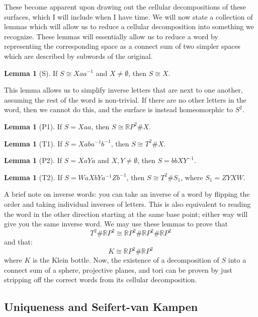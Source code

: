 \documentclass[11pt, oneside]{amsart}   	%
\theoremstyle{definition}
\newtheorem{lemma}[theorem]{Lemma}
\begin{document}
	These become apparent upon drawing out the cellular decompositions of these surfaces, which I will include when I have time. We will now state a collection 
	of lemmas which will allow us to reduce a cellular decomposition into something we recognize. These lemmas will essentially allow us to reduce a word by 
	representing the corresponding space as a connect sum of two simpler spaces which are described by subwords of the original.
	
	\begin{lemma}[S]
		If $S\cong Xaa^{-1}$ and $X\neq\emptyset$, then $S\cong X$.
	\end{lemma}
	
	This lemma allows us to simplify inverse letters that are next to one another, assuming the rest of the word is non-trivial. If there are no other letters in the word, 
	then we cannot do this, and the surface is instead homeomorphic to $S^2$. 
	
	\begin{lemma}[P1]
		If $S = Xaa$, then $S\cong\mathbb RP^2\#X$. 
	\end{lemma}
	
	\begin{lemma}[T1]
		If $S = Xaba^{-1}b^{-1}$, then $S\cong T^2\#X$. 
	\end{lemma}
	
	\begin{lemma}[P2]
		If $S = XaYa$ and $X, Y\neq\emptyset$, then $S = bbXY^{-1}$. 
	\end{lemma}
	
	\begin{lemma}[T2]
		If $S = WaXbYa^{-1}Zb^{-1}$, then $S\cong T^2\# S_1$, where $S_1 = ZYXW$. 
	\end{lemma}
	
	A brief note on inverse words: you can take an inverse of a word by flipping the order and taking individual inverses of letters. This is also equivalent to reading 
	the word in the other direction starting at the same base point; either way will give you the same inverse word. We may use these lemmas to prove that 
	$$
		T^2\#\mathbb RP^2\cong \mathbb RP^2\#\mathbb RP^2\#\mathbb RP^2
	$$
	and that:
	$$
		K\cong\mathbb RP^2\#\mathbb RP^2
	$$
	where $K$ is the Klein bottle. Now, the existence of a decomposition of $S$ into a connect sum of a sphere, projective planes, and tori can be proven by 
	just stripping off the correct words from its cellular decomposition. 
	
	
	\subsection{Uniqueness and Seifert-van Kampen}
	
\end{document}
